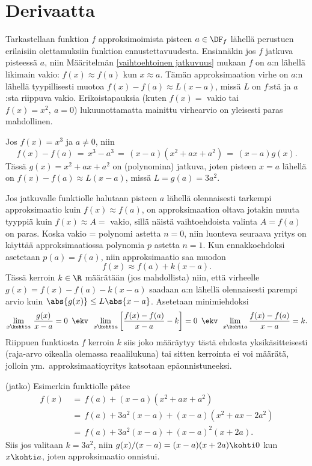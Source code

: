 \section{Derivaatta} \label{derivaatta}
\alku

Tarkastellaan funktion $f$ approksimoimista pisteen $a\in\DF_f$ lähellä perustuen
erilaisiin olettamuksiin funktion ennustettavuudesta. Ensinnäkin jos $f$ jatkuva
pisteessä $a$, niin Määritelmän \ref{vaihtoehtoinen jatkuvuus} mukaan $f$ on $a$:n lähellä
likimain vakio: $f(x) \approx f(a)$ kun $x \approx a$. Tämän approksimaation virhe on
$a$:n lähellä tyypillisesti muotoa $f(x)-f(a) \approx L(x-a)$, missä $L$ on $f$:stä ja $a$:sta
riippuva vakio. Erikoistapauksia (kuten $f(x)=$ vakio tai $f(x)=x^2,\ a=0$) lukuunottamatta
mainittu virhearvio on yleisesti paras mahdollinen.
\begin{Exa} Jos $f(x)=x^3$ ja $a \neq 0$, niin
\[
f(x)-f(a) \,=\, x^3-a^3 \,=\, (x-a)(x^2+ax+a^2) \,=\, (x-a)g(x).
\]
Tässä $g(x)=x^2+ax+a^2$ on (polynomina) jatkuva, joten pisteen $x=a$ lähellä on
$f(x)-f(a) \approx L(x-a)$, missä $L=g(a)=3a^2$. \loppu
\end{Exa} 
Jos jatkuvalle funktiolle halutaan pisteen $a$ lähellä olennaisesti tarkempi approksimaatio
kuin $f(x) \approx f(a)$, on approksimaation oltava jotakin muuta tyyppiä kuin 
$f(x) \approx A =$ vakio, sillä näistä vaihtoehdoista valinta $A=f(a)$ on paras. Koska 
vakio = polynomi astetta $n=0$, niin luonteva seuraava yritys on käyttää approksimaatiossa
polynomia $p$ astetta $n=1$. Kun ennakkoehdoksi asetetaan $p(a)=f(a)$, niin approksimaatio
saa muodon
\[
f(x) \approx f(a) + k(x-a).
\]
Tässä kerroin $k \in \R$ määrätään (jos mahdollista) niin, että virheelle
$g(x)=f(x)-f(a)-k(x-a)$ saadaan $a$:n lähellä olennaisesti parempi arvio kuin
$\abs{g(x)} \le L\abs{x-a}$. Asetetaan minimiehdoksi
\[
\lim_{x \kohti a}\,\frac{g(x)}{x-a} = 0 
                  \,\ \ekv\,\ \lim_{x \kohti a} \left[\frac{f(x)-f(a)}{x-a}-k\right] = 0
                  \,\ \ekv\,\ \lim_{x \kohti a} \frac{f(x)-f(a)}{x-a} = k.
\]
Riippuen funktiosta $f$ kerroin $k$ siis joko määräytyy tästä ehdosta yksikäsitteisesti
(raja-arvo oikealla olemassa  reaalilukuna) tai sitten kerrointa ei voi määrätä, jolloin
ym.\ approksimaatioyritys katsotaan epäonnistuneeksi.
\jatko \begin{Exa} (jatko) Esimerkin funktiolle pätee
\begin{align*}
f(x) &\,=\, f(a)+(x-a)(x^2+ax+a^2) \\
     &\,=\, f(a)+3a^2(x-a)+(x-a)(x^2+ax-2a^2) \\
     &\,=\, f(a)+3a^2(x-a)+(x-a)^2(x+2a).
\end{align*}
Siis jos valitaan $k=3a^2$, niin $g(x)/(x-a)=(x-a)(x+2a) \kohti 0$ kun $x \kohti a$, joten
approksimaatio onnistui. \loppu
\end{Exa}
